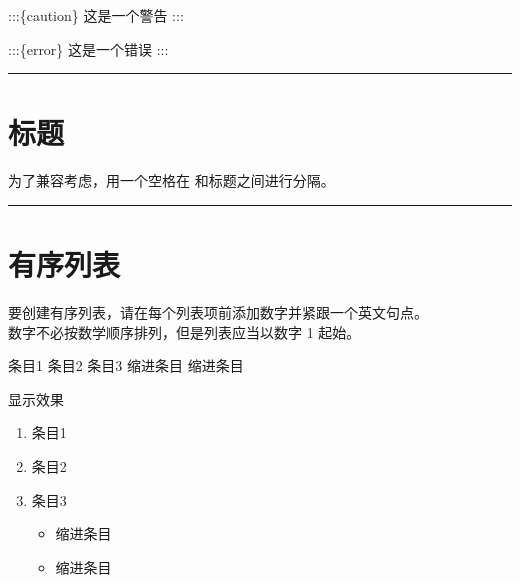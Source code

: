 \documentclass[letterpaper,10pt,english]{sphinxmanual}
\begin{document}
\sphinxAtStartPar
:::\{caution\}
这是一个警告
:::

\sphinxAtStartPar
:::\{error\}
这是一个错误
:::


\bigskip\hrule\bigskip



\section{标题}
\label{\detokenize{other/myst_markdown:id2}}
\sphinxAtStartPar
为了兼容考虑，用一个空格在 \sphinxcode{\sphinxupquote{\#}} 和标题之间进行分隔。

\begin{sphinxVerbatim}[commandchars=\\\{\}]




\end{sphinxVerbatim}


\bigskip\hrule\bigskip



\section{有序列表}
\label{\detokenize{other/myst_markdown:id3}}
\sphinxAtStartPar
要创建有序列表，请在每个列表项前添加数字并紧跟一个英文句点。\\
数字不必按数学顺序排列，但是列表应当以数字 1 起始。

\begin{sphinxVerbatim}[commandchars=\\\{\}]
 条目1
 条目2
 条目3
缩进条目
缩进条目
\end{sphinxVerbatim}

\sphinxAtStartPar
显示效果
\begin{enumerate}
%
\item {} 
\sphinxAtStartPar
条目1

\item {} 
\sphinxAtStartPar
条目2

\item {} 
\sphinxAtStartPar
条目3
\begin{itemize}
\item {} 
\sphinxAtStartPar
缩进条目

\item {} 
\sphinxAtStartPar
缩进条目

\end{itemize}

\end{enumerate}
\end{document}

